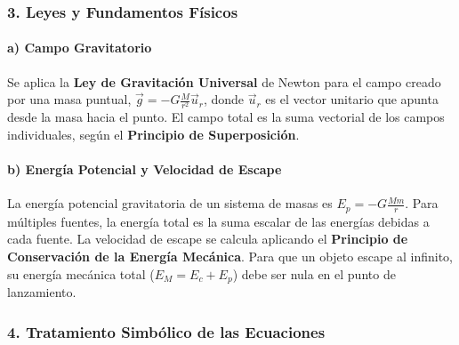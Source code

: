 \subsubsection*{3. Leyes y Fundamentos Físicos}
\paragraph*{a) Campo Gravitatorio}
Se aplica la \textbf{Ley de Gravitación Universal} de Newton para el campo creado por una masa puntual, $\vec{g} = -G \frac{M}{r^2}\vec{u}_r$, donde $\vec{u}_r$ es el vector unitario que apunta desde la masa hacia el punto. El campo total es la suma vectorial de los campos individuales, según el \textbf{Principio de Superposición}.

\paragraph*{b) Energía Potencial y Velocidad de Escape}
La energía potencial gravitatoria de un sistema de masas es $E_p = -G\frac{M m}{r}$. Para múltiples fuentes, la energía total es la suma escalar de las energías debidas a cada fuente. La velocidad de escape se calcula aplicando el \textbf{Principio de Conservación de la Energía Mecánica}. Para que un objeto escape al infinito, su energía mecánica total ($E_M = E_c + E_p$) debe ser nula en el punto de lanzamiento.

\subsubsection*{4. Tratamiento Simbólico de las Ecuaciones}
